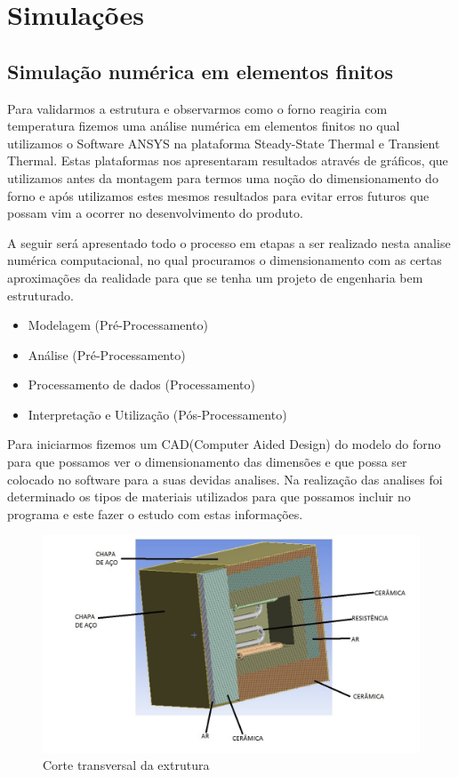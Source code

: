 \section{Simulações}
\subsection{Simulação numérica em elementos finitos}
Para validarmos a estrutura e observarmos como o forno reagiria com temperatura fizemos
uma análise numérica em elementos finitos no qual utilizamos o Software ANSYS na plataforma
Steady-State Thermal e Transient Thermal. Estas plataformas nos apresentaram resultados através
de gráficos, que utilizamos antes da montagem para termos uma noção do dimensionamento do
forno e após utilizamos estes mesmos resultados para evitar erros futuros que possam vim a ocorrer
no desenvolvimento do produto.

A seguir será apresentado todo o processo em etapas a ser realizado nesta analise numérica
computacional, no qual procuramos o dimensionamento com as certas aproximações da realidade
para que se tenha um projeto de engenharia bem estruturado.
\begin{itemize}
	\item Modelagem (Pré-Processamento)
	\item Análise (Pré-Processamento)
	\item Processamento de dados (Processamento)
	\item Interpretação e Utilização (Pós-Processamento)
\end{itemize}

Para iniciarmos fizemos um CAD(Computer Aided Design) do modelo do forno para que
possamos ver o dimensionamento das dimensões e que possa ser colocado no software para a suas
devidas analises. Na realização das analises foi determinado os tipos de materiais utilizados para que
possamos incluir no programa e este fazer o estudo com estas informações.
\begin{figure}[H]
	\centering
	\label{ansys1}
	\includegraphics[keepaspectratio=true,scale=0.7]{figuras/ansys1.jpg}
	\caption{Corte transversal da extrutura}
\end{figure}


